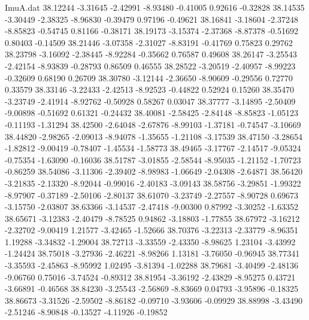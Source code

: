 \begin{filecontents}{ImuA.dat}
  38.12244   -3.31645   -2.42991   -8.93480   -0.41005    0.92616   -0.32828
  38.14535   -3.30449   -2.38325   -8.96830   -0.39479    0.97196   -0.49621
  38.16841   -3.18604   -2.37248   -8.85823   -0.54745    0.81166   -0.38171
  38.19173   -3.15374   -2.37368   -8.87378   -0.51692    0.80403   -0.14509
  38.21446   -3.07358   -2.31027   -8.83191   -0.41769    0.75823    0.29762
  38.23798   -3.16092   -2.38445   -8.92284   -0.35662    0.76587    0.49608
  38.26147   -3.25543   -2.42154   -8.93839   -0.28793    0.86509    0.46555
  38.28522   -3.20519   -2.40957   -8.99223   -0.32609    0.68190    0.26709
  38.30780   -3.12144   -2.36650   -8.90609   -0.29556    0.72770    0.33579
  38.33146   -3.22433   -2.42513   -8.92523   -0.44822    0.52924    0.15260
  38.35470   -3.23749   -2.41914   -8.92762   -0.50928    0.58267    0.03047
  38.37777   -3.14895   -2.50409   -9.00898   -0.51692    0.61321   -0.24432
  38.40081   -2.58425   -2.84148   -8.85823   -1.05123   -0.11193   -1.31294
  38.42500   -2.64048   -2.67876   -8.99103   -1.37181   -0.74547   -3.10669
  38.44820   -2.98265   -2.09013   -8.94078   -1.35655   -1.21108   -3.17539
  38.47150   -3.28654   -1.82812   -9.00419   -0.78407   -1.45534   -1.58773
  38.49465   -3.17767   -2.14517   -9.05324   -0.75354   -1.63090   -0.16036
  38.51787   -3.01855   -2.58544   -8.95035   -1.21152   -1.70723   -0.86259
  38.54086   -3.11306   -2.39402   -8.98983   -1.06649   -2.04308   -2.64871
  38.56420   -3.21835   -2.13320   -8.92044   -0.99016   -2.40183   -3.09143
  38.58756   -3.29851   -1.99322   -8.97907   -0.37189   -2.50106   -2.80137
  38.61070   -3.23749   -2.27557   -8.90728    0.69673   -3.15750   -2.03807
  38.63366   -3.14537   -2.47418   -9.00300    0.87992   -3.30252   -1.63352
  38.65671   -3.12383   -2.40479   -8.78525    0.94862   -3.18803   -1.77855
  38.67972   -3.16212   -2.32702   -9.00419    1.21577   -3.42465   -1.52666
  38.70376   -3.22313   -2.33779   -8.96351    1.19288   -3.34832   -1.29004
  38.72713   -3.33559   -2.43350   -8.98625    1.23104   -3.43992   -1.24424
  38.75018   -3.27936   -2.46221   -8.98266    1.13181   -3.76050   -0.96945
  38.77341   -3.35593   -2.45863   -8.95992    1.02495   -3.81394   -1.02288
  38.79681   -3.40499   -2.48136   -9.06760    0.75016   -3.74524   -0.89312
  38.81954   -3.36192   -2.43829   -8.95275    0.43721   -3.66891   -0.46568
  38.84230   -3.25543   -2.56869   -8.83669    0.04793   -3.95896   -0.18325
  38.86673   -3.31526   -2.59502   -8.86182   -0.09710   -3.93606   -0.09929
  38.88998   -3.43490   -2.51246   -8.90848   -0.13527   -4.11926   -0.19852

\end{filecontents}
